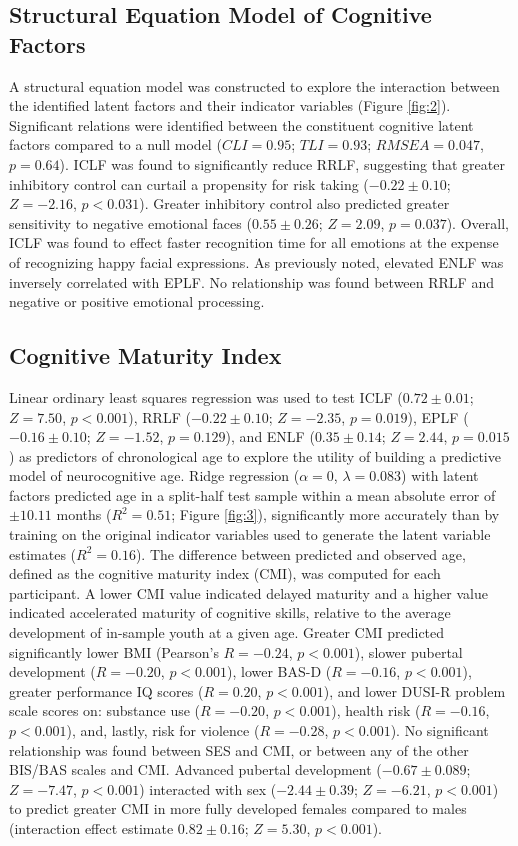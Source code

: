 \documentclass[utf8]{stylesheet}
\begin{document}
\subsection{Structural Equation Model of Cognitive Factors} A structural equation model was constructed to explore the interaction between the identified latent factors and their indicator variables (Figure \ref{fig:2}). Significant relations were identified between the constituent cognitive latent factors compared to a null model ($CLI = 0.95$; $TLI = 0.93$; $RMSEA = 0.047$, $p = 0.64$). ICLF was found to significantly reduce RRLF, suggesting that greater inhibitory control can curtail a propensity for risk taking ($-0.22\pm0.10$; $Z=-2.16$, $p<0.031$). Greater inhibitory control also predicted greater sensitivity to negative emotional faces ($0.55\pm0.26$; $Z=2.09$, $p = 0.037$). Overall, ICLF was found to effect faster recognition time for all emotions at the expense of recognizing happy facial expressions. As previously noted, elevated ENLF was inversely correlated with EPLF. No relationship was found between RRLF and negative or positive emotional processing.
\subsection{Cognitive Maturity Index} Linear ordinary least squares regression was used to test ICLF ($0.72\pm0.01$; $Z=7.50$, $p<0.001$), RRLF ($-0.22\pm0.10$; $Z=-2.35$, $p = 0.019$), EPLF ($-0.16\pm0.10$; $Z=-1.52$, $p=0.129$), and ENLF ($0.35\pm0.14$; $Z=2.44$, $p=0.015$) as predictors of chronological age to explore the utility of building a predictive model of neurocognitive age. Ridge regression ($\alpha = 0$, $\lambda = 0.083$) with latent factors predicted age in a split-half test sample within a mean absolute error of $\pm 10.11$ months ($R^2=0.51$; Figure \ref{fig:3}), significantly more accurately than by training on the original indicator variables used to generate the latent variable estimates ($R^2=0.16$). The difference between predicted and observed age, defined as the cognitive maturity index (CMI), was computed for each participant. A lower CMI value indicated delayed maturity and a higher value indicated accelerated maturity of cognitive skills, relative to the average development of in-sample youth at a given age. Greater CMI predicted significantly lower BMI (Pearson's $R=-0.24$, $p<0.001$), slower pubertal development ($R=-0.20$, $p<0.001$), lower BAS-D ($R=-0.16$, $p<0.001$), greater performance IQ scores ($R=0.20$, $p<0.001$), and lower DUSI-R problem scale scores on: substance use ($R=-0.20$, $p<0.001$), health risk ($R=-0.16$, $p<0.001$), and, lastly, risk for violence ($R=-0.28$, $p<0.001$). No significant relationship was found between SES and CMI, or between any of the other BIS/BAS scales and CMI. Advanced pubertal development ($-0.67\pm0.089$; $Z=-7.47$, $p<0.001$) interacted with sex ($-2.44\pm0.39$; $Z=-6.21$, $p<0.001$) to predict greater CMI in more fully developed females compared to males (interaction effect estimate $0.82\pm0.16$; $Z=5.30$, $p<0.001$).
%
\end{document}
